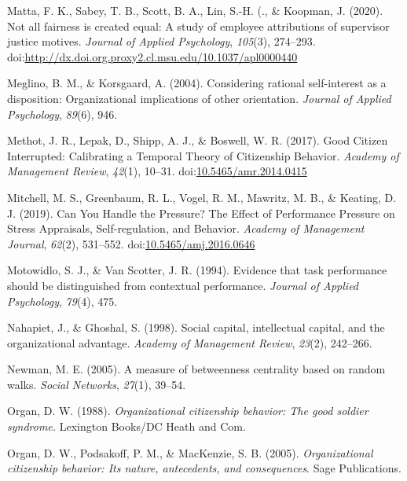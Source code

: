 \documentclass[english,,man]{apa6}
\theoremstyle{definition}
\theoremstyle{definition}
\theoremstyle{definition}
\theoremstyle{remark}
\begin{document}
\leavevmode\hypertarget{ref-matta_not_2020}{}%
Matta, F. K., Sabey, T. B., Scott, B. A., Lin, S.-H. (., \& Koopman, J.
(2020). Not all fairness is created equal: A study of employee
attributions of supervisor justice motives. \emph{Journal of Applied
Psychology}, \emph{105}(3), 274--293.
doi:\href{https://doi.org/http://dx.doi.org.proxy2.cl.msu.edu/10.1037/apl0000440}{http://dx.doi.org.proxy2.cl.msu.edu/10.1037/apl0000440}

\leavevmode\hypertarget{ref-meglino_considering_2004}{}%
Meglino, B. M., \& Korsgaard, A. (2004). Considering rational
self-interest as a disposition: Organizational implications of other
orientation. \emph{Journal of Applied Psychology}, \emph{89}(6), 946.

\leavevmode\hypertarget{ref-methot_good_2017}{}%
Methot, J. R., Lepak, D., Shipp, A. J., \& Boswell, W. R. (2017). Good
Citizen Interrupted: Calibrating a Temporal Theory of Citizenship
Behavior. \emph{Academy of Management Review}, \emph{42}(1), 10--31.
doi:\href{https://doi.org/10.5465/amr.2014.0415}{10.5465/amr.2014.0415}

\leavevmode\hypertarget{ref-mitchell_can_2019}{}%
Mitchell, M. S., Greenbaum, R. L., Vogel, R. M., Mawritz, M. B., \&
Keating, D. J. (2019). Can You Handle the Pressure? The Effect of
Performance Pressure on Stress Appraisals, Self-regulation, and
Behavior. \emph{Academy of Management Journal}, \emph{62}(2), 531--552.
doi:\href{https://doi.org/10.5465/amj.2016.0646}{10.5465/amj.2016.0646}

\leavevmode\hypertarget{ref-motowidlo1994evidence}{}%
Motowidlo, S. J., \& Van Scotter, J. R. (1994). Evidence that task
performance should be distinguished from contextual performance.
\emph{Journal of Applied Psychology}, \emph{79}(4), 475.

\leavevmode\hypertarget{ref-nahapiet_social_1998}{}%
Nahapiet, J., \& Ghoshal, S. (1998). Social capital, intellectual
capital, and the organizational advantage. \emph{Academy of Management
Review}, \emph{23}(2), 242--266.

\leavevmode\hypertarget{ref-newman2005measure}{}%
Newman, M. E. (2005). A measure of betweenness centrality based on
random walks. \emph{Social Networks}, \emph{27}(1), 39--54.

\leavevmode\hypertarget{ref-organ_organizational_1988}{}%
Organ, D. W. (1988). \emph{Organizational citizenship behavior: The good
soldier syndrome.} Lexington Books/DC Heath and Com.

\leavevmode\hypertarget{ref-organ_organizational_2005}{}%
Organ, D. W., Podsakoff, P. M., \& MacKenzie, S. B. (2005).
\emph{Organizational citizenship behavior: Its nature, antecedents, and
consequences}. Sage Publications.
\end{document}
